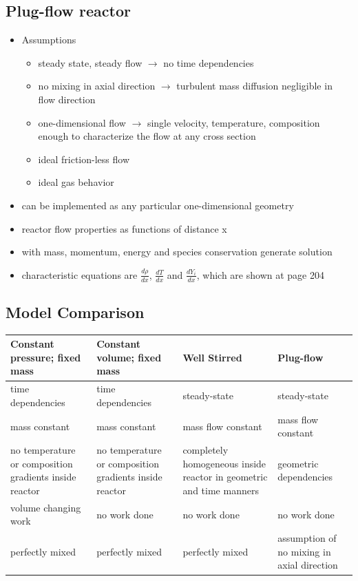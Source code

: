 \documentclass[12pt,oneside,a4paper,english]{article}
\begin{document}
\subsection {Plug-flow reactor} %
\begin{itemize}
\item{Assumptions}

	\begin{itemize}
	\item{steady state, steady flow $\rightarrow$ no time dependencies}
	\item{no mixing in axial direction $\rightarrow$ turbulent mass diffusion negligible in flow direction}
	\item{one-dimensional flow $\rightarrow$ single velocity, temperature, composition enough to characterize the flow at any cross section}
	\item{ideal friction-less flow}
	\item{ideal gas behavior}
	\end{itemize}

\item{can be implemented as any particular one-dimensional geometry}
\item{reactor flow properties as functions of distance x}
\item{with mass, momentum, energy and species conservation generate solution}
\item{characteristic equations are $\frac{d\rho}{dx}$, $\frac{dT}{dx}$ and $\frac{dY_i}{dx}$, which are shown at page 204}

\end{itemize}

\subsection {Model Comparison} %

\begin{center}
 \begin{tabular}{|p{} | p{} | p{} | p{}|}
 \hline
Constant pressure; fixed mass & Constant volume; fixed mass & Well Stirred & Plug-flow \\ [0.5ex] 
 \hline\hline
time dependencies  & time dependencies & steady-state & steady-state \\ 
 \hline
 mass constant & mass constant & mass flow constant & mass flow constant \\
 \hline
 no temperature or composition gradients inside reactor & no temperature or composition gradients inside reactor & completely homogeneous inside reactor in geometric and time manners & geometric dependencies \\
 \hline
 volume changing work & no work done & no work done & no work done \\
 \hline
perfectly mixed & perfectly mixed & perfectly mixed & assumption of no mixing in axial direction \\ [1ex] 
 \hline
\end{tabular}
\end{center}
\end{document}
